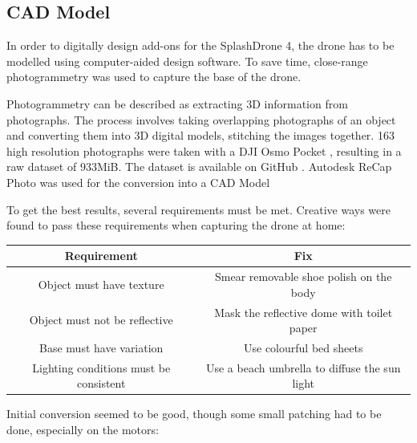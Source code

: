 \newpage
\subsection{CAD Model}
In order to digitally design add-ons for the SplashDrone 4, the drone has to be modelled using computer-aided design software. To save time, close-range photogrammetry was used to capture the base of the drone.

Photogrammetry can be described as extracting \gls{3D} information from photographs. The process involves taking overlapping photographs of an object and converting them into \gls{3D} digital models, stitching the images together. 163 high resolution photographs were taken with a DJI Osmo Pocket \cite{osmopocket}, resulting in a raw dataset of 933\gls{MiB}. The dataset is available on GitHub \cite{dronemodel}. Autodesk ReCap Photo was used for the conversion into a \gls{CAD} Model \cite{autodeskrecap}

To get the best results, several requirements must be met. Creative ways were found to pass these requirements when capturing the drone at home:

\begin{center}
\begin{tabular}{ |c|c| } 
 \hline
 Requirement & Fix  \\ 
 \hline
 Object must have texture & Smear removable shoe polish on the body \\ 
 Object must not be reflective & Mask the reflective dome with toilet paper \\ 
 Base must have variation & Use colourful bed sheets \\ 
 Lighting conditions must be consistent & Use a beach umbrella to diffuse the sun light \\ 
 \hline
\end{tabular}
\end{center}

Initial conversion seemed to be good, though some small patching had to be done, especially on the motors:

